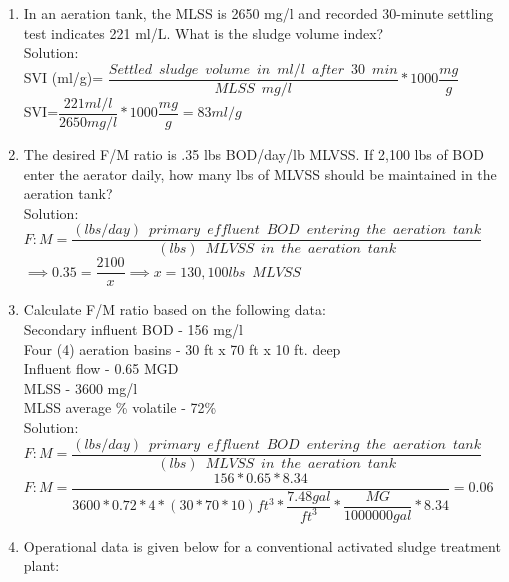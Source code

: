 \documentclass{article}
\begin{document}
\begin{enumerate}
\item In an aeration tank, the MLSS is 2650 mg/l and recorded 30-minute settling test indicates 221 ml/L.  What is the sludge volume index?\\
\vspace{0.3cm}
Solution:\\
SVI (ml/g)= $\dfrac{Settled \enspace sludge \enspace volume \enspace in \enspace ml/l \enspace after \enspace 30 \enspace min}{MLSS \enspace mg/l}*1000 \dfrac{mg}{g}$\\
\vspace{0.5cm}
SVI=$\dfrac{221ml/l}{2650mg/l}*1000\dfrac{mg}{g}=\boxed{83ml/g}$
\item The desired F/M ratio is .35 lbs BOD/day/lb MLVSS. If 2,100 lbs of BOD enter the aerator daily, how many lbs of MLVSS should be maintained in the aeration tank?\\
Solution:\\
$F:M=\dfrac{(lbs/day) \enspace primary \enspace effluent  \enspace BOD \enspace entering \enspace the  \enspace aeration \enspace tank}{(lbs) \enspace MLVSS \enspace in \enspace the  \enspace aeration \enspace tank}$\\
\vspace{0.3cm}
$\implies 0.35=\dfrac{2100}{x}\implies x = \boxed{130,100lbs \enspace MLVSS}$\\

\item Calculate F/M ratio based on the following data:\\
Secondary influent BOD - 156 mg/l\\
Four (4) aeration basins - 30 ft x 70 ft x 10 ft. deep\\
Influent flow - 0.65 MGD\\
MLSS - 3600 mg/l\\
MLSS average \% volatile - 72\%\\
Solution:\\
\vspace{0.3cm}
$F:M=\dfrac{(lbs/day) \enspace primary \enspace effluent  \enspace BOD \enspace entering \enspace the  \enspace aeration \enspace tank}{(lbs) \enspace MLVSS \enspace in \enspace the  \enspace aeration \enspace tank}$\\
\vspace{0.3cm}
$F:M=\dfrac{156*0.65*8.34}{3600*0.72*4*(30*70*10)ft^3* \dfrac{7.48gal}{ft^3}*\dfrac{MG}{1000000gal}*8.34}=\boxed{0.06}$\\
\pagebreak

\item Operational data is given below for a conventional activated sludge treatment plant:\\


\end{enumerate}
\end{document}
